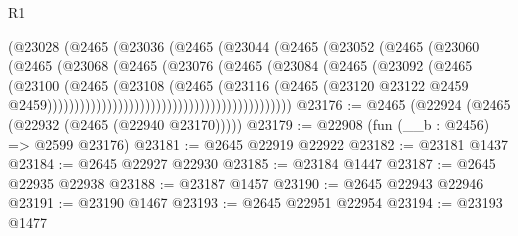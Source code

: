 \begin{lexlean}{R1}
\begin{coremodule}
                                            (@23028
                                              (@2465
                                                (@23036
                                                  (@2465
                                                    (@23044
                                                      (@2465
                                                        (@23052
                                                          (@2465
                                                            (@23060
                                                              (@2465
                                                                (@23068
                                                                  (@2465
                                                                    (@23076
                                                                      (@2465
                                                                        (@23084
                                                                          (@2465
                                                                            (@23092
                                                                              (@2465
                                                                                (@23100
                                                                                  (@2465
                                                                                    (@23108
                                                                                      (@2465
                                                                                        (@23116
                                                                                          (@2465
                                                                                            (@23120
                                                                                              @23122
                                                                                              @2459
                                                                                              @2459)))))))))))))))))))))))))))))))))))))))))))))
@23176 := @2465 (@22924 (@2465 (@22932 (@2465 (@22940 @23170)))))
@23179 := @22908 (fun (__b : @2456) => @2599 @23176)
@23181 := @2645 @22919 @22922
@23182 := @23181 @1437
@23184 := @2645 @22927 @22930
@23185 := @23184 @1447
@23187 := @2645 @22935 @22938
@23188 := @23187 @1457
@23190 := @2645 @22943 @22946
@23191 := @23190 @1467
@23193 := @2645 @22951 @22954
@23194 := @23193 @1477

\end{coremodule}
\end{lexlean}
